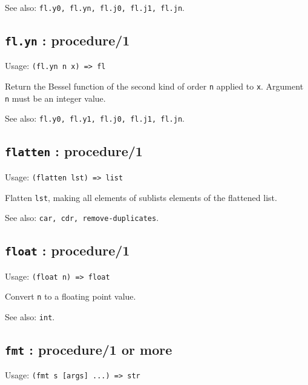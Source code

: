 \documentclass[
]{article}
\newcommand{\passthrough}[1]{#1}
\begin{document}
See also: \passthrough{\lstinline!fl.y0, fl.yn, fl.j0, fl.j1, fl.jn!}.

\hypertarget{fl.yn-procedure1-1}{%
\subsection{\texorpdfstring{\texttt{fl.yn} :
procedure/1}{fl.yn : procedure/1}}\label{fl.yn-procedure1-1}}

Usage: \passthrough{\lstinline!(fl.yn n x) => fl!}

Return the Bessel function of the second kind of order
\passthrough{\lstinline!n!} applied to \passthrough{\lstinline!x!}.
Argument \passthrough{\lstinline!n!} must be an integer value.

See also: \passthrough{\lstinline!fl.y0, fl.y1, fl.j0, fl.j1, fl.jn!}.

\hypertarget{flatten-procedure1-1}{%
\subsection{\texorpdfstring{\texttt{flatten} :
procedure/1}{flatten : procedure/1}}\label{flatten-procedure1-1}}

Usage: \passthrough{\lstinline!(flatten lst) => list!}

Flatten \passthrough{\lstinline!lst!}, making all elements of sublists
elements of the flattened list.

See also: \passthrough{\lstinline!car, cdr, remove-duplicates!}.

\hypertarget{float-procedure1-1}{%
\subsection{\texorpdfstring{\texttt{float} :
procedure/1}{float : procedure/1}}\label{float-procedure1-1}}

Usage: \passthrough{\lstinline!(float n) => float!}

Convert \passthrough{\lstinline!n!} to a floating point value.

See also: \passthrough{\lstinline!int!}.

\hypertarget{fmt-procedure1-or-more-1}{%
\subsection{\texorpdfstring{\texttt{fmt} : procedure/1 or
more}{fmt : procedure/1 or more}}\label{fmt-procedure1-or-more-1}}

Usage: \passthrough{\lstinline!(fmt s [args] ...) => str!}
\end{document}
